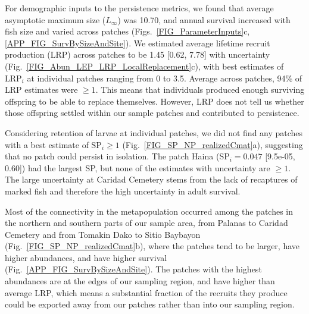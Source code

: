 \documentclass[12pt, oneside]{article}   	%
\begin{document}
For demographic inputs to the persistence metrics, we found that average asymptotic maximum size ($L_\infty$) was 10.70, and annual survival increased with fish size and varied across patches (Figs.\ \ref{FIG_ParameterInputs}c, \ref{APP_FIG_SurvBySizeAndSite}). We estimated average lifetime recruit production (LRP) across patches to be 1.45 [0.62, 7.78] with uncertainty (Fig.\ \ref{FIG_Abun_LEP_LRP_LocalReplacement}c), with best estimates of $\text{LRP}_{i}$ at individual patches ranging from 0 to 3.5. Average across patches, 94\% of LRP estimates were $\geq 1$. This means that individuals produced enough surviving offspring to be able to replace themselves. However, LRP does not tell us whether those offspring settled within our sample patches and contributed to persistence. 

Considering retention of larvae at individual patches, we did not find any patches with a best estimate of $\text{SP}_{i} \geq 1$ (Fig.\ \ref{FIG_SP_NP_realizedCmat}a), suggesting that no patch could persist in isolation. The patch Haina ($\text{SP}_i = 0.047$ [9.5e-05, 0.60]) had the largest SP, but none of the estimates with uncertainty are $\geq 1$. The large uncertainty at Caridad Cemetery stems from the lack of recaptures of marked fish and therefore the high uncertainty in adult survival.


Most of the connectivity in the metapopulation occurred among the patches in the northern and southern parts of our sample area, from Palanas to Caridad Cemetery and from Tomakin Dako to Sitio Baybayon (Fig.\ \ref{FIG_SP_NP_realizedCmat}b), where the patches tend to be larger, have higher abundances, and have higher survival (Fig.\ \ref{APP_FIG_SurvBySizeAndSite}). The patches with the highest abundances are at the edges of our sampling region, and have higher than average LRP, which means a substantial fraction of the recruits they produce could be exported away from our patches rather than into our sampling region. %
\end{document}
